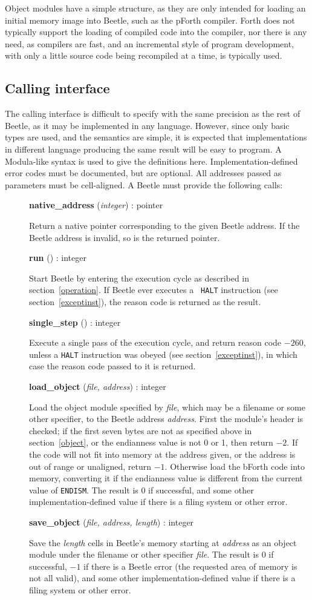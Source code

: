 \documentclass[english]{article}
\newlength{\itemwidth}\itemwidth=\textwidth \advance\itemwidth by -0.1in
\newlength{\innerwidth}\innerwidth=\itemwidth \advance\innerwidth by -0.5in
\newcommand{\iface}[4]{\item[]\parbox{\itemwidth}{{\bf #1} ({\it #2}\/) :
#3\\[0.5ex]\hspace*{0.4in}\parbox{\innerwidth}{#4}}}
\begin{document}
Object modules have a simple structure, as they are only intended for loading an
initial memory image into Beetle, such as the pForth compiler. Forth does not
typically support the loading of compiled code into the compiler, nor there is
any need, as compilers are fast, and an incremental style of program
development, with only a little source code being recompiled at a time, is
typically used.


\subsection{Calling interface}
\label{calls}

The calling interface is difficult to specify with the same precision as the
rest of Beetle, as it may be implemented in any language. However, since only
basic types are used, and the semantics are simple, it is expected that
implementations in different language producing the same result will be easy to
program. A Modula-like syntax is used to give the definitions here.
Implementation-defined error codes must be documented, but are optional. All
addresses passed as parameters must be cell-aligned. A Beetle must provide the
following calls:

\begin{description}
\iface{native\_address}{integer}{pointer}{Return a native pointer corresponding
    to the given Beetle address. If the Beetle address is invalid, so is the returned pointer.}
\iface{run}{}{integer}{Start Beetle by entering the execution cycle as
    described in section~\ref{operation}. If Beetle ever executes a {\tt
    HALT} instruction (see section~\ref{exceptinst}), the reason code is
    returned as the result.}
\iface{single\_step}{}{integer}{Execute a single pass of the execution
    cycle, and return reason code $-260$, unless a {\tt HALT} instruction was
    obeyed (see section~\ref{exceptinst}), in which case the reason code
    passed to it is returned.}
\iface{load\_object}{file, address}{integer}{Load the object module
    specified by \textit{file}, which may be a filename or some other
    specifier, to the Beetle address \textit{address}. First the module's
    header is checked; if the first seven bytes are not as specified above
    in section~\ref{object}, or the endianness value is not 0 or 1, then
    return $-2$. If the code will not fit into memory at the address given, or
    the address is out of range or unaligned, return $-1$. Otherwise load the bForth code into
    memory, converting it if the endianness value is different from the current
    value of {\tt ENDISM}. The result is 0 if successful, and some other
    implementation-defined value if there is a filing system or other error.}
\iface{save\_object}{file, address, length}{integer}{Save the \textit{length}
    cells in Beetle's memory starting at \textit{address} as an object module
    under the filename or other specifier \textit{file}. The result is 0 if
    successful, $-1$ if there is a Beetle error (the requested area of memory is not all valid), and some other
    implementation-defined value if there is a filing system or other error.}
\end{description}
\end{document}
